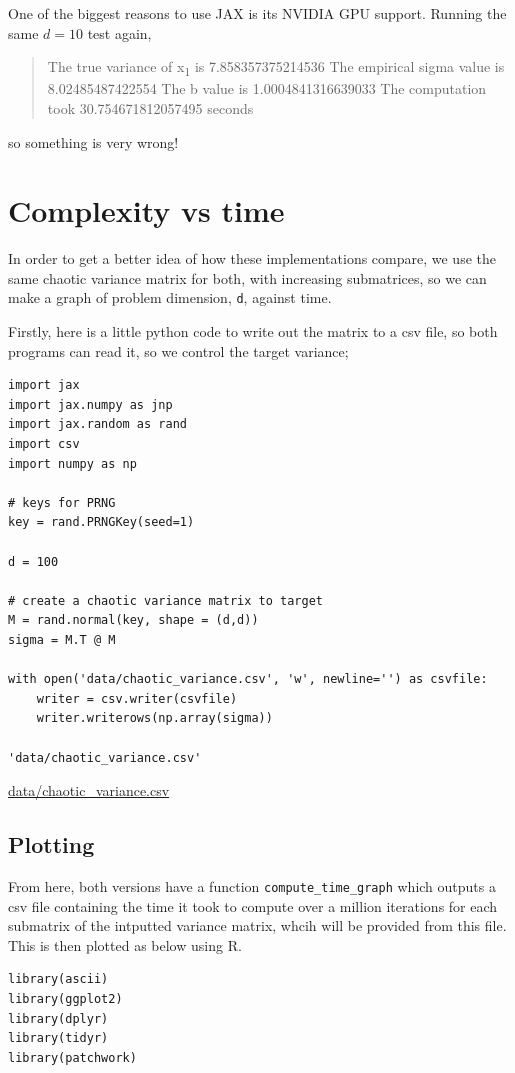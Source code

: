 \documentclass[letterpaper]{article}
\begin{document}
One of the biggest reasons to use JAX is its NVIDIA GPU support. Running the same \(d=10\) test again, 

\begin{quote}
The true variance of x\textsubscript{1} is 7.858357375214536
The empirical sigma value is 8.02485487422554
The b value is 1.0004841316639033
The computation took 30.754671812057495 seconds
\end{quote}

so something is very wrong!
\section{Complexity vs time}
\label{sec:orgfda74dc}

In order to get a better idea of how these implementations compare, we use the same chaotic variance matrix for both, with increasing submatrices, so we can make a graph of problem dimension, \texttt{d}, against time.

Firstly, here is a little python code to write out the matrix to a csv file, so both programs can read it, so we control the target variance;

\begin{verbatim}
import jax
import jax.numpy as jnp
import jax.random as rand
import csv
import numpy as np

# keys for PRNG
key = rand.PRNGKey(seed=1)

d = 100

# create a chaotic variance matrix to target
M = rand.normal(key, shape = (d,d))
sigma = M.T @ M

with open('data/chaotic_variance.csv', 'w', newline='') as csvfile:
    writer = csv.writer(csvfile)
    writer.writerows(np.array(sigma))

'data/chaotic_variance.csv'
\end{verbatim}

\url{data/chaotic\_variance.csv}
\subsection{Plotting}
\label{sec:org473d783}

From here, both versions have a function \texttt{compute\_time\_graph} which outputs a csv file containing the time it took to compute over a million iterations for each submatrix of the intputted variance matrix, whcih will be provided from this file. This is then plotted as below using R.

\begin{verbatim}
library(ascii)
library(ggplot2)
library(dplyr)
library(tidyr)
library(patchwork)
\end{verbatim}
\end{document}
